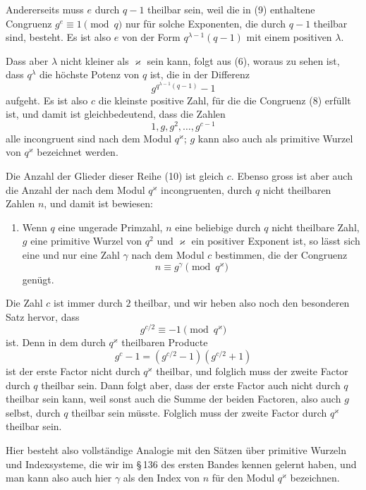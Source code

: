 \documentclass[11pt]{article}
\begin{document}
Andererseits muss $e$ durch $q-1$ theilbar sein, weil die in (9) enthaltene Congruenz $g^e\equiv1\pmod q$ nur für solche Exponenten, die durch $q-1$ theilbar sind, besteht. Es ist also $e$ von der Form $q^{\lambda-1}(q-1)$ mit einem positiven $\lambda$.

Dass aber $\lambda$ nicht kleiner als $\varkappa$ sein kann, folgt aus (6), woraus zu sehen ist, dass $q^\lambda$ die höchste Potenz von $q$ ist, die in der Differenz
\[
g^{q^{\lambda-1}(q-1)}-1
\]
aufgeht. Es ist also $c$ die kleinste positive Zahl, für die die Congruenz (8) erfüllt ist, und damit ist gleichbedeutend, dass die Zahlen
\begin{equation}
1,g,g^2,
\ldots,g^{c-1}
\tag{10}
\end{equation}
alle incongruent sind nach dem Modul $q^\varkappa$; $g$ kann also auch als primitive Wurzel von $q^\varkappa$ bezeichnet werden.

Die Anzahl der Glieder dieser Reihe (10) ist gleich $c$. Ebenso gross ist aber auch die Anzahl der nach dem Modul $q^\varkappa$ incongruenten, durch $q$ nicht theilbaren Zahlen $n$, und damit ist bewiesen:

\begin{enumerate}[resume,label=\arabic*.]
\item Wenn $q$ eine ungerade Primzahl, $n$ eine beliebige durch $q$ nicht theilbare Zahl, $g$ eine primitive Wurzel von $q^2$ und $\varkappa$ ein positiver Exponent ist, so lässt sich eine und nur eine Zahl $\gamma$ nach dem Modul $c$ bestimmen, die der Congruenz
\[
n\equiv g^\gamma\pmod{q^\varkappa}
\]
genügt.
\end{enumerate}

Die Zahl $c$ ist immer durch $2$ theilbar, und wir heben also noch den besonderen Satz hervor, dass
\begin{equation}
g^{c/2}\equiv-1\pmod{q^\varkappa}
\tag{11}
\end{equation}
ist. Denn in dem durch $q^\varkappa$ theilbaren Producte
\[
g^c-1=(g^{c/2}-1)(g^{c/2}+1)
\]
ist der erste Factor nicht durch $q^\varkappa$ theilbar, und folglich muss der zweite Factor durch $q$ theilbar sein. Dann folgt aber, dass der erste Factor auch nicht durch $q$ theilbar sein kann, weil sonst auch die Summe der beiden Factoren, also auch $g$ selbst, durch $q$ theilbar sein müsste. Folglich muss der zweite Factor durch $q^\varkappa$ theilbar sein.

Hier besteht also vollständige Analogie mit den Sätzen über primitive Wurzeln und Indexsysteme, die wir im \S\,136 des ersten Bandes kennen gelernt haben, und man kann also auch hier $\gamma$ als den Index von $n$ für den Modul $q^\varkappa$ bezeichnen.
\end{document}
